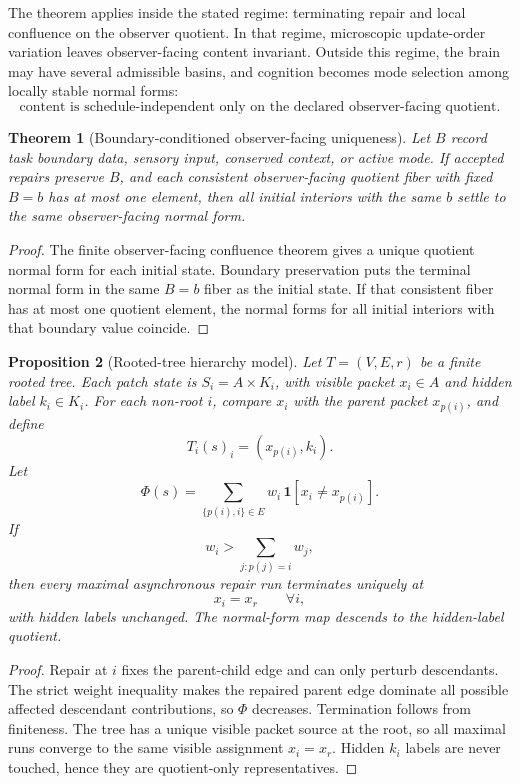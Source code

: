 \documentclass[11pt]{article}
\newtheorem{theorem}{Theorem}[section]
\newtheorem{proposition}[theorem]{Proposition}
\theoremstyle{remark}
\theoremstyle{plain}
\begin{document}
The theorem applies inside the stated regime: terminating repair and local confluence on the observer quotient. In that regime, microscopic update-order variation leaves observer-facing content invariant. Outside this regime, the brain may have several admissible basins, and cognition becomes mode selection among locally stable normal forms:
\[
\boxed{
\text{content is schedule-independent only on the declared observer-facing quotient.}
}
\]

\begin{theorem}[Boundary-conditioned observer-facing uniqueness]
Let \(B\) record task boundary data, sensory input, conserved context, or active mode. If accepted
repairs preserve \(B\), and each consistent observer-facing quotient fiber with fixed \(B=b\) has
at most one element, then all initial interiors with the same \(b\) settle to the same
observer-facing normal form.
\end{theorem}

\begin{proof}
The finite observer-facing confluence theorem gives a unique quotient normal form for each initial state. Boundary
preservation puts the terminal normal form in the same \(B=b\) fiber as the initial state. If that
consistent fiber has at most one quotient element, the normal forms for all initial interiors with
that boundary value coincide.
\end{proof}

\begin{proposition}[Rooted-tree hierarchy model]
Let \(T=(V,E,r)\) be a finite rooted tree. Each patch state is \(S_i=A\times K_i\), with visible packet \(x_i\in A\) and hidden label \(k_i\in K_i\). For each non-root \(i\), compare \(x_i\) with the parent packet \(x_{p(i)}\), and define
\[
T_i(s)_i=(x_{p(i)},k_i).
\]
Let
\[
\Phi(s)=
\sum_{\{p(i),i\}\in E}
w_i\,\mathbf 1[x_i\ne x_{p(i)}].
\]
If
\[
w_i>\sum_{j:p(j)=i}w_j,
\]
then every maximal asynchronous repair run terminates uniquely at
\[
x_i=x_r\qquad\forall i,
\]
with hidden labels unchanged. The normal-form map descends to the hidden-label quotient.
\end{proposition}

\begin{proof}
Repair at \(i\) fixes the parent-child edge and can only perturb descendants. The strict weight inequality makes the repaired parent edge dominate all possible affected descendant contributions, so \(\Phi\) decreases. Termination follows from finiteness. The tree has a unique visible packet source at the root, so all maximal runs converge to the same visible assignment \(x_i=x_r\). Hidden \(k_i\) labels are never touched, hence they are quotient-only representatives.
\end{proof}
\end{document}
